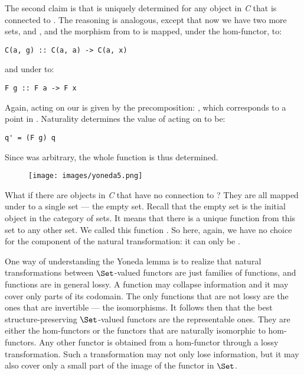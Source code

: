 The second claim is that  is uniquely determined for any
object  in \emph{C} that is connected to . The
reasoning is analogous, except that now we have two more sets,
 and , and the morphism  from
 to  is mapped, under the hom-functor, to:

\begin{Verbatim}[commandchars=\\\{\}]
C(a, g) :: C(a, a) -> C(a, x)
\end{Verbatim}
and under  to:

\begin{Verbatim}[commandchars=\\\{\}]
F g :: F a -> F x
\end{Verbatim}
Again,  acting on our  is given by the
precomposition: , which corresponds to a point
 in . Naturality determines the value
of  acting on  to be:

\begin{Verbatim}[commandchars=\\\{\}]
q' = (F g) q
\end{Verbatim}
Since  was arbitrary, the whole function  is
thus determined.

\begin{figure}[H]
\centering
\texttt{[image: images/yoneda5.png]}
\end{figure}

\noindent
What if there are objects in \emph{C} that have no connection to
? They are all mapped under  to a single set
--- the empty set. Recall that the empty set is the initial object in
the category of sets. It means that there is a unique function from this
set to any other set. We called this function . So here,
again, we have no choice for the component of the natural
transformation: it can only be .

One way of understanding the Yoneda lemma is to realize that natural
transformations between $\Set$-valued functors are just families
of functions, and functions are in general lossy. A function may
collapse information and it may cover only parts of its codomain. The
only functions that are not lossy are the ones that are invertible ---
the isomorphisms. It follows then that the best structure-preserving
$\Set$-valued functors are the representable ones. They are either
the hom-functors or the functors that are naturally isomorphic to
hom-functors. Any other functor  is obtained from a
hom-functor through a lossy transformation. Such a transformation may
not only lose information, but it may also cover only a small part of
the image of the functor  in $\Set$.

